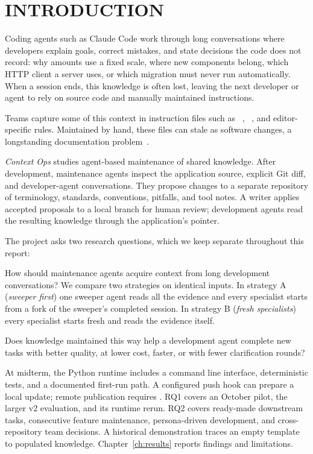 \chapter{INTRODUCTION}

Coding agents such as Claude Code work through long conversations where developers explain goals, correct mistakes, and state decisions the code does not record: why amounts use a fixed scale, where new components belong, which HTTP client a server uses, or which migration must never run automatically. When a session ends, this knowledge is often lost, leaving the next developer or agent to rely on source code and manually maintained instructions.

Teams capture some of this context in instruction files such as ~\cite{claudememory}, ~\cite{agentsmd}, and editor-specific rules. Maintained by hand, these files can stale as software changes, a longstanding documentation problem~\cite{lehman1980,parnas1994,aghajani2019}.

\emph{Context Ops} studies agent-based maintenance of shared knowledge. After development, maintenance agents inspect the application source, explicit Git diff, and developer-agent conversations. They propose changes to a separate repository of terminology, standards, conventions, pitfalls, and tool notes. A writer applies accepted proposals to a local branch for human review; development agents read the resulting knowledge through the application's  pointer.

The project asks two research questions, which we keep separate throughout this report:

\begin{description}[leftmargin=1.5em,labelindent=0em]
  \item[RQ1 (maintenance).] How should maintenance agents acquire context from long development conversations? We compare two strategies on identical inputs. In strategy A (\emph{sweeper first}) one sweeper agent reads all the evidence and every specialist starts from a fork of the sweeper's completed session. In strategy B (\emph{fresh specialists}) every specialist starts fresh and reads the evidence itself.
  \item[RQ2 (downstream use).] Does knowledge maintained this way help a development agent complete new tasks with better quality, at lower cost, faster, or with fewer clarification rounds?
\end{description}

At midterm, the Python runtime includes a command line interface, deterministic tests, and a documented first-run path. A configured push hook can prepare a local update; remote publication requires . RQ1 covers an October pilot, the larger v2 evaluation, and its runtime rerun. RQ2 covers ready-made downstream tasks, consecutive feature maintenance, persona-driven development, and cross-repository team decisions. A historical demonstration traces an empty template to populated knowledge. Chapter~\ref{ch:results} reports findings and limitations.

